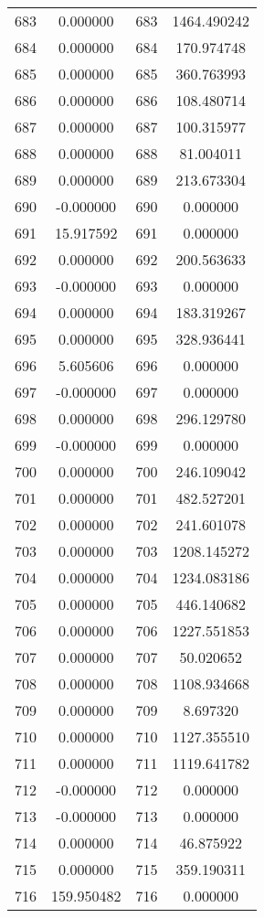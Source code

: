 \documentclass[12pt]{article}
\begin{document}
\begin{longtable}{@{}cccc@{}}
683 & 0.000000 & 683 & 1464.490242 \\
684 & 0.000000 & 684 & 170.974748 \\
685 & 0.000000 & 685 & 360.763993 \\
686 & 0.000000 & 686 & 108.480714 \\
687 & 0.000000 & 687 & 100.315977 \\
688 & 0.000000 & 688 & 81.004011 \\
689 & 0.000000 & 689 & 213.673304 \\
690 & -0.000000 & 690 & 0.000000 \\
691 & 15.917592 & 691 & 0.000000 \\
692 & 0.000000 & 692 & 200.563633 \\
693 & -0.000000 & 693 & 0.000000 \\
694 & 0.000000 & 694 & 183.319267 \\
695 & 0.000000 & 695 & 328.936441 \\
696 & 5.605606 & 696 & 0.000000 \\
697 & -0.000000 & 697 & 0.000000 \\
698 & 0.000000 & 698 & 296.129780 \\
699 & -0.000000 & 699 & 0.000000 \\
700 & 0.000000 & 700 & 246.109042 \\
701 & 0.000000 & 701 & 482.527201 \\
702 & 0.000000 & 702 & 241.601078 \\
703 & 0.000000 & 703 & 1208.145272 \\
704 & 0.000000 & 704 & 1234.083186 \\
705 & 0.000000 & 705 & 446.140682 \\
706 & 0.000000 & 706 & 1227.551853 \\
707 & 0.000000 & 707 & 50.020652 \\
708 & 0.000000 & 708 & 1108.934668 \\
709 & 0.000000 & 709 & 8.697320 \\
710 & 0.000000 & 710 & 1127.355510 \\
711 & 0.000000 & 711 & 1119.641782 \\
712 & -0.000000 & 712 & 0.000000 \\
713 & -0.000000 & 713 & 0.000000 \\
714 & 0.000000 & 714 & 46.875922 \\
715 & 0.000000 & 715 & 359.190311 \\
716 & 159.950482 & 716 & 0.000000 \\

\end{longtable}
\end{document}
